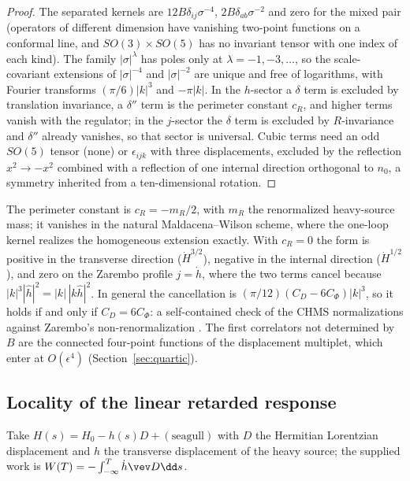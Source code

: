 \begin{proof}
The separated kernels are $12B\delta_{ij}\sigma^{-4}$, $2B\delta_{ab}\sigma^{-2}$ and zero for the mixed
pair (operators of different dimension have vanishing two-point functions on a conformal line, and
$SO(3)\times SO(5)$ has no invariant tensor with one index of each kind). The family $|\sigma|^\lambda$ has
poles only at $\lambda=-1,-3,\dots$, so the scale-covariant extensions of $|\sigma|^{-4}$ and $|\sigma|^{-2}$
are unique and free of logarithms, with Fourier transforms $(\pi/6)|k|^3$ and $-\pi|k|$. In the $h$-sector a
$\delta$ term is excluded by translation invariance, a $\delta''$ term is the perimeter constant $c_R$, and
higher terms vanish with the regulator; in the $j$-sector the $\delta$ term is excluded by $R$-invariance and
$\delta''$ already vanishes, so that sector is universal. Cubic terms need an odd $SO(5)$ tensor (none) or
$\epsilon_{ijk}$ with three displacements, excluded by the reflection $x^2\to-x^2$ combined with a reflection
of one internal direction orthogonal to $n_0$, a symmetry inherited from a ten-dimensional rotation.
\end{proof}

The perimeter constant is $c_R=-m_R/2$, with $m_R$ the renormalized heavy-source mass; it vanishes in the
natural Maldacena--Wilson scheme, where the one-loop kernel realizes the homogeneous extension exactly. With
$c_R=0$ the form is positive in the transverse direction ($\dot H^{3/2}$), negative in the internal
direction ($\dot H^{1/2}$), and zero on the Zarembo profile $j=\dot h$, where the two terms cancel because
$|k|^3|\hat h|^2=|k|\,|k\hat h|^2$. In general the cancellation is $(\pi/12)(C_D-6C_\Phi)|k|^3$, so it holds
if and only if $C_D=6C_\Phi$: a self-contained check of the CHMS normalizations against Zarembo's
non-renormalization \cite{Zarembo,GuralnikKulik,DGGM}. The first correlators not determined by $B$ are the
connected four-point functions of the displacement multiplet, which enter at $O(\epsilon^4)$
(Section~\ref{sec:quartic}).

\subsection{Locality of the linear retarded response}

Take $H(s)=H_0-h(s)D+(\text{seagull})$ with $D$ the Hermitian Lorentzian displacement and $h$ the transverse
displacement of the heavy source; the supplied work is $W(T)=-\int_{-\infty}^T\dot h\vev D\dd s$.

